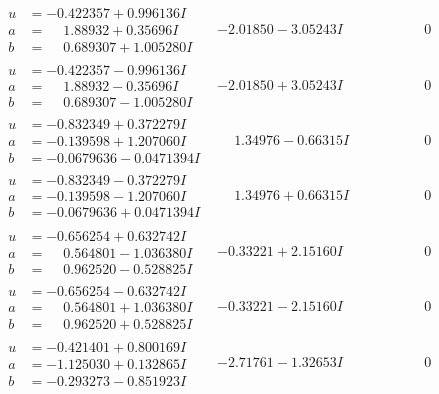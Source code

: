 \documentclass[1p]{elsarticle_modified}
\theoremstyle{definition}
\begin{document}
$$\begin{array}{c|c|c}
\begin{aligned}
u &= -0.422357 + 0.996136 I \\
a &= \phantom{-}1.88932 + 0.35696 I \\
b &= \phantom{-}0.689307 + 1.005280 I\end{aligned}
 & -2.01850 - 3.05243 I & \phantom{-0.000000 } 0 \\ \hline\begin{aligned}
u &= -0.422357 - 0.996136 I \\
a &= \phantom{-}1.88932 - 0.35696 I \\
b &= \phantom{-}0.689307 - 1.005280 I\end{aligned}
 & -2.01850 + 3.05243 I & \phantom{-0.000000 } 0 \\ \hline\begin{aligned}
u &= -0.832349 + 0.372279 I \\
a &= -0.139598 + 1.207060 I \\
b &= -0.0679636 - 0.0471394 I\end{aligned}
 & \phantom{-}1.34976 - 0.66315 I & \phantom{-0.000000 } 0 \\ \hline\begin{aligned}
u &= -0.832349 - 0.372279 I \\
a &= -0.139598 - 1.207060 I \\
b &= -0.0679636 + 0.0471394 I\end{aligned}
 & \phantom{-}1.34976 + 0.66315 I & \phantom{-0.000000 } 0 \\ \hline\begin{aligned}
u &= -0.656254 + 0.632742 I \\
a &= \phantom{-}0.564801 - 1.036380 I \\
b &= \phantom{-}0.962520 - 0.528825 I\end{aligned}
 & -0.33221 + 2.15160 I & \phantom{-0.000000 } 0 \\ \hline\begin{aligned}
u &= -0.656254 - 0.632742 I \\
a &= \phantom{-}0.564801 + 1.036380 I \\
b &= \phantom{-}0.962520 + 0.528825 I\end{aligned}
 & -0.33221 - 2.15160 I & \phantom{-0.000000 } 0 \\ \hline\begin{aligned}
u &= -0.421401 + 0.800169 I \\
a &= -1.125030 + 0.132865 I \\
b &= -0.293273 - 0.851923 I\end{aligned}
 & -2.71761 - 1.32653 I & \phantom{-0.000000 } 0 \\ \hline\begin{aligned}

\end{aligned}
\end{array}$$
\end{document}
